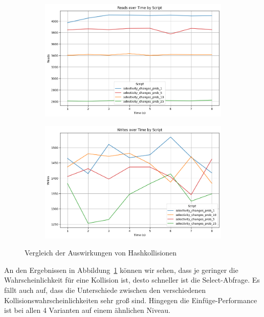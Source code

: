 \begin{figure}[H]
    \centering
    \begin{subfigure}[t]{0.48\textwidth}
        \centering
        \includegraphics[width=\textwidth]{PNGs/Script/Index/Hash/selectivity-change/Reads}
    \end{subfigure}
    \hfill
    \begin{subfigure}[t]{0.48\textwidth}
        \centering
        \includegraphics[width=\textwidth]{PNGs/Script/Index/Hash/selectivity-change/Writes}
    \end{subfigure}
    \vspace{-8pt}
    \caption[Hash-Indexing: Auswirkungen von Hashkollisionen]{Vergleich der Auswirkungen von Hashkollisionen}
    \label{fig:hash-collision-comparison}
\end{figure}
\vspace{-17pt}

An den Ergebnissen in Abbildung~\ref{fig:hash-collision-comparison} können wir sehen, dass je geringer die Wahrscheinlichkeit für eine Kollision ist, desto schneller ist die Select-Abfrage.
Es fällt auch auf, dass die Unterschiede zwischen den verschiedenen Kollisionswahrscheinlichkeiten sehr groß sind.
Hingegen die Einfüge-Performance ist bei allen 4 Varianten auf einem ähnlichen Niveau.


